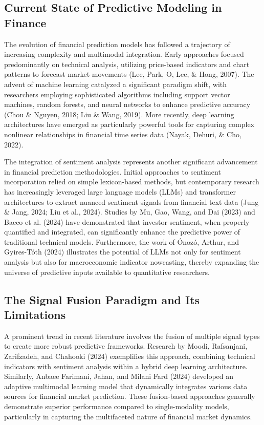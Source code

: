 \documentclass{singlecol-new}
\theoremstyle{TH}{
\newtheorem{lemma}{Lemma}
\newtheorem{theorem}[lemma]{Theorem}
\newtheorem{corrolary}[lemma]{Corrolary}
\newtheorem{conjecture}[lemma]{Conjecture}
\newtheorem{proposition}[lemma]{Proposition}
\newtheorem{claim}[lemma]{Claim}
\newtheorem{stheorem}[lemma]{Wrong Theorem}
\newtheorem{algorithm}{Algorithm}
}
\theoremstyle{THrm}{
\newtheorem{definition}{Definition}[section]
\newtheorem{question}{Question}[section]
\newtheorem{remark}{Remark}
\newtheorem{scheme}{Scheme}
}
\theoremstyle{THhit}{
\newtheorem{case}{Case}[section]
}
\begin{document}
\subsection{Current State of Predictive Modeling in Finance}

The evolution of financial prediction models has followed a trajectory of increasing complexity and multimodal integration. Early approaches focused predominantly on technical analysis, utilizing price-based indicators and chart patterns to forecast market movements (Lee, Park, O, Lee, \& Hong, 2007). The advent of machine learning catalyzed a significant paradigm shift, with researchers employing sophisticated algorithms including support vector machines, random forests, and neural networks to enhance predictive accuracy (Chou \& Nguyen, 2018; Liu \& Wang, 2019). More recently, deep learning architectures have emerged as particularly powerful tools for capturing complex nonlinear relationships in financial time series data (Nayak, Dehuri, \& Cho, 2022).

The integration of sentiment analysis represents another significant advancement in financial prediction methodologies. Initial approaches to sentiment incorporation relied on simple lexicon-based methods, but contemporary research has increasingly leveraged large language models (LLMs) and transformer architectures to extract nuanced sentiment signals from financial text data (Jung \& Jang, 2024; Liu et al., 2024). Studies by Mu, Gao, Wang, and Dai (2023) and Bacco et al. (2024) have demonstrated that investor sentiment, when properly quantified and integrated, can significantly enhance the predictive power of traditional technical models. Furthermore, the work of Ónozó, Arthur, and Gyires-Tóth (2024) illustrates the potential of LLMs not only for sentiment analysis but also for macroeconomic indicator nowcasting, thereby expanding the universe of predictive inputs available to quantitative researchers.

\subsection{The Signal Fusion Paradigm and Its Limitations}

A prominent trend in recent literature involves the fusion of multiple signal types to create more robust predictive frameworks. Research by Moodi, Rafsanjani, Zarifzadeh, and Chahooki (2024) exemplifies this approach, combining technical indicators with sentiment analysis within a hybrid deep learning architecture. Similarly, Anbaee Farimani, Jahan, and Milani Fard (2024) developed an adaptive multimodal learning model that dynamically integrates various data sources for financial market prediction. These fusion-based approaches generally demonstrate superior performance compared to single-modality models, particularly in capturing the multifaceted nature of financial market dynamics.
\end{document}
